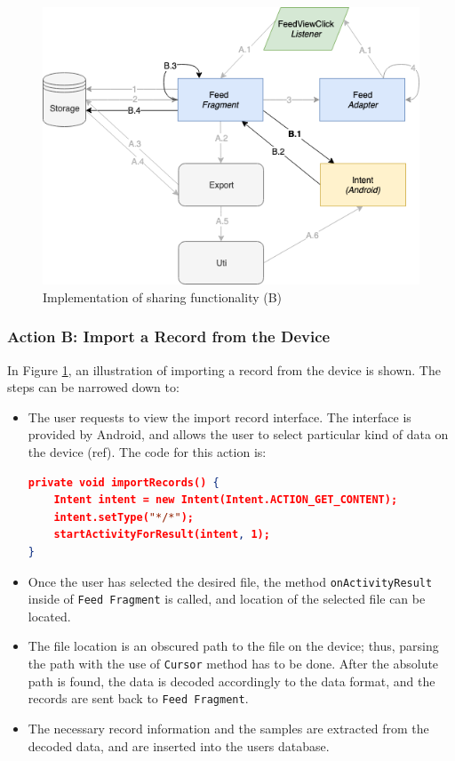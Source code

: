 \begin{figure}
    \centering
    \includegraphics[scale=0.6]{images/Sharing_ImpB.png}
    \caption{Implementation of sharing functionality (B)}
    \label{fig:impl_sharingB}
\end{figure}

\subsubsection{Action B: Import a Record from the Device}
In Figure \ref{fig:impl_sharingB}, an illustration of importing a record from the device is shown. The steps can be narrowed down to:

\begin{itemize}
    \item[B.1] The user requests to view the import record interface. The interface is provided by Android, and allows the user to select particular kind of data on the device (ref). The code for this action is:
\begin{lstlisting}[language=json, caption={My Caption}, captionpos=b]
private void importRecords() {
    Intent intent = new Intent(Intent.ACTION_GET_CONTENT);
    intent.setType("*/*");
    startActivityForResult(intent, 1);
}

\end{lstlisting}
    \item[B.2] Once the user has selected the desired file, the method \verb|onActivityResult| inside of \verb|Feed Fragment| is called, and location of the selected file can be located. 
    \item[B.3] The file location is an obscured path to the file on the device; thus, parsing the path with the use of \verb|Cursor| method has to be done. After the absolute path is found, the data is decoded accordingly to the data format, and the records are sent back to \verb|Feed Fragment|.
    \item[B.4] The necessary record information and the samples are extracted from the decoded data, and are inserted into the users database. 
\end{itemize}



